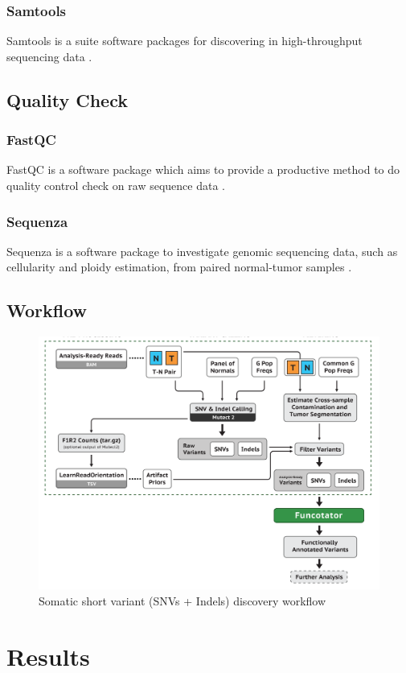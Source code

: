 \documentclass[a4paper]{article}
\begin{document}
            \subsubsection{Samtools}
                Samtools is a suite software packages for discovering in high-throughput sequencing data \cite{samtools1}.

        \subsection{Quality Check}
            \subsubsection{FastQC}
                FastQC is a software package which aims to provide a productive method to do quality control check on raw sequence data \cite{fastqc1}.

            \subsubsection{Sequenza}
                Sequenza is a software package to investigate genomic sequencing data, such as cellularity and ploidy estimation, from paired normal-tumor samples \cite{sequenza1}.

        \subsection{Workflow}

            \begin{figure}[p]
                \centering
                \includegraphics[width=0.6 \linewidth]{figures/Workflow/somatic_short_variants.png}
                \caption{Somatic short variant (SNVs + Indels) discovery workflow \protect\cite{gatk1, gatk2}}
            \end{figure}

    \section{Results}
\end{document}
